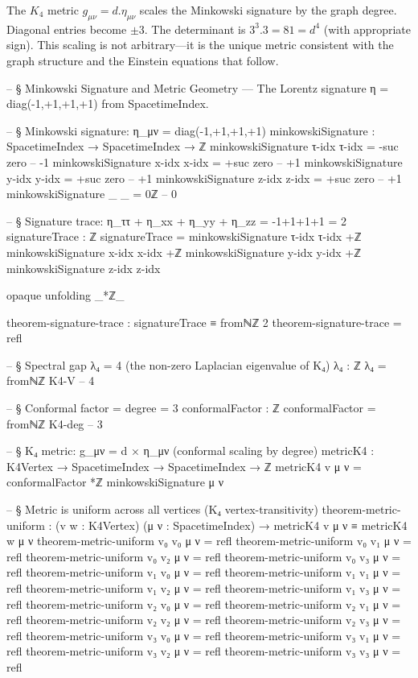 \documentclass[11pt,a4paper]{book}
\def\cdot{.}%
\begin{document}
The $K_4$ metric $g_{\mu\nu} = d \cdot \eta_{\mu\nu}$ scales the Minkowski signature by the graph degree. Diagonal entries become $\pm 3$. The determinant is $3^3 \cdot 3 = 81 = d^4$ (with appropriate sign). This scaling is not arbitrary---it is the unique metric consistent with the graph structure and the Einstein equations that follow.

\begin{code}
-- § Minkowski Signature and Metric Geometry — The Lorentz signature η = diag(-1,+1,+1,+1) from SpacetimeIndex.

-- § Minkowski signature: η_μν = diag(-1,+1,+1,+1)
minkowskiSignature : SpacetimeIndex → SpacetimeIndex → ℤ
minkowskiSignature τ-idx τ-idx = -suc zero    -- -1
minkowskiSignature x-idx x-idx = +suc zero    -- +1
minkowskiSignature y-idx y-idx = +suc zero    -- +1
minkowskiSignature z-idx z-idx = +suc zero    -- +1
minkowskiSignature _     _     = 0ℤ           -- 0

-- § Signature trace: η_ττ + η_xx + η_yy + η_zz = -1+1+1+1 = 2
signatureTrace : ℤ
signatureTrace = minkowskiSignature τ-idx τ-idx +ℤ
                 minkowskiSignature x-idx x-idx +ℤ
                 minkowskiSignature y-idx y-idx +ℤ
                 minkowskiSignature z-idx z-idx

opaque
  unfolding _*ℤ_

  theorem-signature-trace : signatureTrace ≡ fromℕℤ 2
  theorem-signature-trace = refl

-- § Spectral gap λ₄ = 4 (the non-zero Laplacian eigenvalue of K₄)
λ₄ : ℤ
λ₄ = fromℕℤ K4-V  -- 4

-- § Conformal factor = degree = 3
conformalFactor : ℤ
conformalFactor = fromℕℤ K4-deg  -- 3

-- § K₄ metric: g_μν = d × η_μν (conformal scaling by degree)
metricK4 : K4Vertex → SpacetimeIndex → SpacetimeIndex → ℤ
metricK4 v μ ν = conformalFactor *ℤ minkowskiSignature μ ν

-- § Metric is uniform across all vertices (K₄ vertex-transitivity)
theorem-metric-uniform : (v w : K4Vertex) (μ ν : SpacetimeIndex) →
  metricK4 v μ ν ≡ metricK4 w μ ν
theorem-metric-uniform v₀ v₀ μ ν = refl
theorem-metric-uniform v₀ v₁ μ ν = refl
theorem-metric-uniform v₀ v₂ μ ν = refl
theorem-metric-uniform v₀ v₃ μ ν = refl
theorem-metric-uniform v₁ v₀ μ ν = refl
theorem-metric-uniform v₁ v₁ μ ν = refl
theorem-metric-uniform v₁ v₂ μ ν = refl
theorem-metric-uniform v₁ v₃ μ ν = refl
theorem-metric-uniform v₂ v₀ μ ν = refl
theorem-metric-uniform v₂ v₁ μ ν = refl
theorem-metric-uniform v₂ v₂ μ ν = refl
theorem-metric-uniform v₂ v₃ μ ν = refl
theorem-metric-uniform v₃ v₀ μ ν = refl
theorem-metric-uniform v₃ v₁ μ ν = refl
theorem-metric-uniform v₃ v₂ μ ν = refl
theorem-metric-uniform v₃ v₃ μ ν = refl


\end{code}
\end{document}
